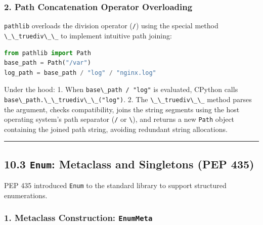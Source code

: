 \hypertarget{path-concatenation-operator-overloading}{%
\subsubsection{2. Path Concatenation Operator
Overloading}\label{path-concatenation-operator-overloading}}

\passthrough{\lstinline!pathlib!} overloads the division operator
(\passthrough{\lstinline!/!}) using the special method
\passthrough{\lstinline!\_\_truediv\_\_!} to implement intuitive path
joining:

\begin{lstlisting}[language=Python]
from pathlib import Path
base_path = Path("/var")
log_path = base_path / "log" / "nginx.log"
\end{lstlisting}

Under the hood: 1. When \passthrough{\lstinline!base\_path / "log"!} is
evaluated, CPython calls
\passthrough{\lstinline!base\_path.\_\_truediv\_\_("log")!}. 2. The
\passthrough{\lstinline!\_\_truediv\_\_!} method parses the argument,
checks compatibility, joins the string segments using the host operating
system's path separator (\passthrough{\lstinline!/!} or
\passthrough{\lstinline!\\!}), and returns a new
\passthrough{\lstinline!Path!} object containing the joined path string,
avoiding redundant string allocations.

\begin{center}\rule{0.5\linewidth}{0.5pt}\end{center}

\hypertarget{enum-metaclass-and-singletons-pep-435}{%
\subsection{\texorpdfstring{10.3 \texttt{Enum}: Metaclass and Singletons
(PEP
435)}{10.3 Enum: Metaclass and Singletons (PEP 435)}}\label{enum-metaclass-and-singletons-pep-435}}

PEP 435 introduced \passthrough{\lstinline!Enum!} to the standard
library to support structured enumerations.

\hypertarget{metaclass-construction-enummeta}{%
\subsubsection{\texorpdfstring{1. Metaclass Construction:
\texttt{EnumMeta}}{1. Metaclass Construction: EnumMeta}}\label{metaclass-construction-enummeta}}

